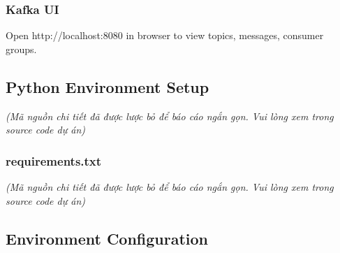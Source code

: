 \begin{Shaded}
\begin{Highlighting}[]

\DataTypeTok{\textbackslash{}}
  \DataTypeTok{\textbackslash{}}
   \DataTypeTok{\textbackslash{}}
\end{Highlighting}
\end{Shaded}

\hypertarget{kafka-ui}{%
\subsubsection{Kafka UI}}

Open http://localhost:8080 in browser to view topics, messages, consumer
groups.

\hypertarget{python-environment-setup}{%
\subsection{Python Environment Setup}}

\emph{(Mã nguồn chi tiết đã được lược bỏ để báo cáo ngắn gọn. Vui lòng
xem trong source code dự án)}

\hypertarget{requirements.txt}{%
\subsubsection{requirements.txt}}

\emph{(Mã nguồn chi tiết đã được lược bỏ để báo cáo ngắn gọn. Vui lòng
xem trong source code dự án)}

\hypertarget{environment-configuration}{%
\subsection{Environment Configuration}}

\begin{Shaded}
\begin{Highlighting}[]
\end{Highlighting}
\end{Shaded}

